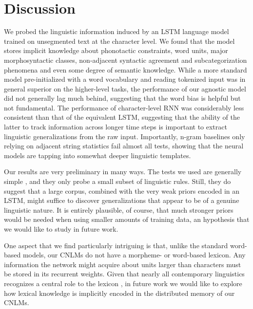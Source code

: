 \section{Discussion}
\label{sec:discussion}

We probed the linguistic information induced by an LSTM language model
trained on unsegmented text at the character level. We found that the
model stores implicit knowledge about phonotactic constraints, word
units, major morphosyntactic classes, non-adjacent syntactic agreement
and subcategorization phenomena and even some degree of semantic
knowledge. While a more standard model pre-initialized with a word
vocabulary and reading tokenized input was in general superior on the
higher-level tasks, the performance of our agnostic model did not
generally lag much behind, suggesting that the word bias is helpful
but not fundamental. The performance of character-level RNN was
considerably less consistent than that of the equivalent LSTM, suggesting that
the ability of the latter to track information across longer time
steps is important to extract linguistic generalizations from the raw
input. Importantly, n-gram baselines only relying on adjacent string
statistics fail almost all tests, showing that the neural models
are tapping into somewhat deeper linguistic templates.

Our results are very preliminary in many ways. The tests we used are
generally simple \cite[we did not attempt, for example, to model
long-distance subject-verb agreement, a task that is challenging even
for word-based models:][]{Linzen:etal:2016}, and they only probe a
small subset of linguistic rules. Still, they do suggest that a large
corpus, combined with the very weak priors encoded in an LSTM, might
suffice to discover generalizations that appear to be of a genuine
linguistic nature. It is entirely plausible, of course, that much
stronger priors would be needed when using smaller amounts of training
data, an hypothesis that we would like to study in future work.

One aspect that we find particularly intriguing is that, unlike the
standard word-based models, our CNLMs do not have a morpheme- or
word-based lexicon. Any information the network might acquire about
units larger than characters must be stored in its recurrent
weights. Given that nearly all contemporary linguistics recognizes a
central role to the lexicon \cite[see, e.g.,][for different
perspectives]{Sag:etal:2003,Goldberg:2005,Radford:2006,Bresnan:etal:2016,Jezek:2016},
in future work we would like to explore how lexical knowledge is
implicitly encoded in the distributed memory of our CNLMs.

